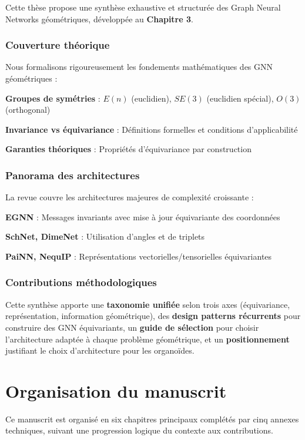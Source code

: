Cette thèse propose une synthèse exhaustive et structurée des Graph Neural Networks géométriques, développée au \textbf{Chapitre 3}.

\subsubsection{Couverture théorique}

Nous formalisons rigoureusement les fondements mathématiques des GNN géométriques :

\textbf{Groupes de symétries} : $E(n)$ (euclidien), $SE(3)$ (euclidien spécial), $O(3)$ (orthogonal)

\textbf{Invariance vs équivariance} : Définitions formelles et conditions d'applicabilité

\textbf{Garanties théoriques} : Propriétés d'équivariance par construction

\subsubsection{Panorama des architectures}

La revue couvre les architectures majeures de complexité croissante :

\textbf{EGNN} : Messages invariants avec mise à jour équivariante des coordonnées

\textbf{SchNet, DimeNet} : Utilisation d'angles et de triplets

\textbf{PaiNN, NequIP} : Représentations vectorielles/tensorielles équivariantes

\subsubsection{Contributions méthodologiques}

Cette synthèse apporte une \textbf{taxonomie unifiée} selon trois axes (équivariance, représentation, information géométrique), des \textbf{design patterns récurrents} pour construire des GNN équivariants, un \textbf{guide de sélection} pour choisir l'architecture adaptée à chaque problème géométrique, et un \textbf{positionnement} justifiant le choix d'architecture pour les organoïdes.

\section{Organisation du manuscrit}

Ce manuscrit est organisé en six chapitres principaux complétés par cinq annexes techniques, suivant une progression logique du contexte aux contributions.

